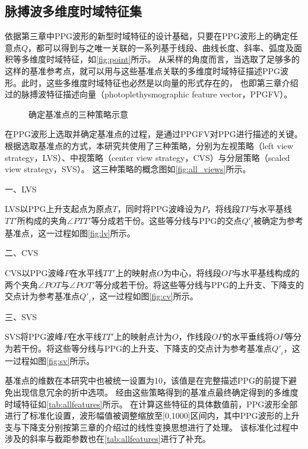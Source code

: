 \subsection{脉搏波多维度时域特征集}

依据第三章中PPG波形的新型时域特征的设计基础，只要在PPG波形上的确定任意点$Q$，都可以得到与之唯一关联的一系列基于线段、曲线长度、斜率、弧度及面积等多维度时域特征，如\autoref{fig:point}所示。
从采样的角度而言，当选取了足够多的这样的基准参考点，就可以用与这些基准点关联的多维度时域特征描述PPG波形。此时，这些多维度时域特征也必然是以向量的形式存在的，
也即第三章介绍过的脉搏波特征描述向量（photoplethysmographic feature vector，PPGFV）。

\begin{figure}[htbp]
  \centering
  \quad
  \quad
  \caption{\label{fig:all_views}确定基准点的三种策略示意}
\end{figure}

在PPG波形上选取并确定基准点的过程，是通过PPGFV对PPG进行描述的关键。
根据选取基准点的方式，本研究共使用了三种策略，分别为左视策略（left view strategy，LVS）、中视策略（center view strategy，CVS）与分层策略（scaled view strategy，SVS）。
这三种策略的概念图如\autoref{fig:all_views}所示。

一、LVS

LVS以PPG上升支起点为原点$T$，同时将PPG波峰设为$P$，将线段$TP$与水平基线$TT'$所构成的夹角$\angle PTT'$等分成若干份。这些等分线与PPG的交点${Q'}_i$被确定为参考基准点，这一过程如图\autoref{fig:lv}所示。

二、CVS

CVS以PPG波峰$P$在水平线$TT'$上的映射点$O$为中心，将线段$OP$与水平基线构成的两个夹角$\angle POT$与$\angle POT'$等分成若干份。将这些等分线与PPG的上升支、下降支的交点计为参考基准点${Q'}_i$，这一过程如图\autoref{fig:cv}所示。

三、SVS

SVS将PPG波峰$P$在水平线$TT'$上的映射点计为$O$，作线段$OP$的水平垂线将$OP$等分为若干份。将这些等分线与PPG的上升支、下降支的交点计为参考基准点${Q'}_i$，这一过程如图\autoref{fig:sv}所示。

基准点的维数在本研究中也被统一设置为10，该值是在完整描述PPG的前提下避免出现信息冗余的折中选项。
经由这些策略得到的基准点最终确定得到的多维度时域特征如\autoref{tab:allfeatures}所示。
在计算这些特征的具体数值前，PPG波形全部进行了标准化设置，波形幅值被调整缩放至[0,1000]区间内，其中PPG波形的上升支与下降支分别按第三章的介绍过的线性变换思想进行了处理。
该标准化过程中涉及的斜率与截距参数也在\autoref{tab:allfeatures}进行了补充。

